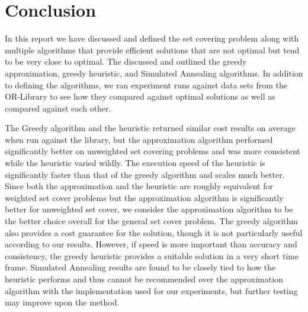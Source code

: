 \chapter{Conclusion}
In this report we have discussed and defined the set covering problem along with multiple algorithms that provide efficient solutions that are not optimal but tend to be very close to optimal. The discussed and outlined the greedy approximation, greedy heuristic, and Simulated Annealing algorithms. In addition to defining the algorithms, we ran experiment runs against data sets from the OR-Library to see how they compared against optimal solutions as well as compared against each other.

The Greedy algorithm and the heuristic returned similar cost results on average when run against the library, but the approximation algorithm performed significantly better on unweighted set covering problems and was more consistent while the heuristic varied wildly. The execution speed of the heuristic is significantly faster than that of the greedy algorithm and scales much better. Since both the approximation and the heuristic are roughly equivalent for weighted set cover problems but the approximation algorithm is significantly better for unweighted set cover, we consider the approximation algorithm to be the better choice overall for the general set cover problem. The greedy algorithm also provides a cost guarantee for the solution, though it is not particularly useful according to our results. However, if speed is more important than accuracy and consistency, the greedy heuristic provides a suitable solution in a very short time frame. Simulated Annealing results are found to be closely tied to how the heuristic performs and thus cannot be recommended over the approximation algorithm with the implementation used for our experiments, but further testing may improve upon the method.
